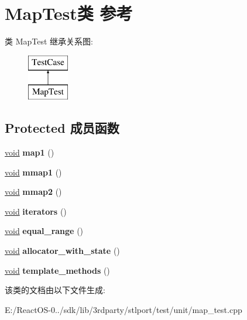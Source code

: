 \hypertarget{class_map_test}{}\section{Map\+Test类 参考}
\label{class_map_test}
类 Map\+Test 继承关系图\+:\begin{figure}[H]
\begin{center}
\leavevmode
\includegraphics[height=2.000000cm]{class_map_test}
\end{center}
\end{figure}
\subsection*{Protected 成员函数}
\begin{DoxyCompactItemize}
\item 
\mbox{\label{class_map_test_a89a597d4b76495a8ca37dea27dfc47f4}} 
\hyperlink{interfacevoid}{void} {\bfseries map1} ()
\item 
\mbox{\label{class_map_test_ad795edb49ded7663423394147f96f10f}} 
\hyperlink{interfacevoid}{void} {\bfseries mmap1} ()
\item 
\mbox{\label{class_map_test_a619b7d425ec84231163cc5f1558ce16a}} 
\hyperlink{interfacevoid}{void} {\bfseries mmap2} ()
\item 
\mbox{\label{class_map_test_a1623566da3a047e1c7cd2214c2b7d646}} 
\hyperlink{interfacevoid}{void} {\bfseries iterators} ()
\item 
\mbox{\label{class_map_test_a9691488b66e3ce18dde32d50988de91e}} 
\hyperlink{interfacevoid}{void} {\bfseries equal\+\_\+range} ()
\item 
\mbox{\label{class_map_test_afbc32860215b7fa6f2204e256a338539}} 
\hyperlink{interfacevoid}{void} {\bfseries allocator\+\_\+with\+\_\+state} ()
\item 
\mbox{\label{class_map_test_a3ab5253df9ae585d064b9f88527d46d7}} 
\hyperlink{interfacevoid}{void} {\bfseries template\+\_\+methods} ()
\end{DoxyCompactItemize}


该类的文档由以下文件生成\+:\begin{DoxyCompactItemize}
\item 
E\+:/\+React\+O\+S-\/0../sdk/lib/3rdparty/stlport/test/unit/map\+\_\+test.\+cpp\end{DoxyCompactItemize}
